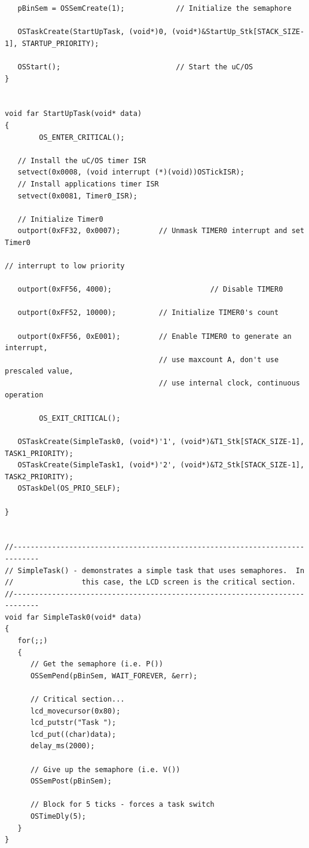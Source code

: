 \begin{verbatim}
   pBinSem = OSSemCreate(1);            // Initialize the semaphore

   OSTaskCreate(StartUpTask, (void*)0, (void*)&StartUp_Stk[STACK_SIZE-1], STARTUP_PRIORITY);

   OSStart();                           // Start the uC/OS
}


void far StartUpTask(void* data)
{
        OS_ENTER_CRITICAL();

   // Install the uC/OS timer ISR
   setvect(0x0008, (void interrupt (*)(void))OSTickISR);
   // Install applications timer ISR
   setvect(0x0081, Timer0_ISR);

   // Initialize Timer0
   outport(0xFF32, 0x0007);         // Unmask TIMER0 interrupt and set Timer0
                                                                                        // interrupt to low priority

   outport(0xFF56, 4000);                       // Disable TIMER0

   outport(0xFF52, 10000);          // Initialize TIMER0's count

   outport(0xFF56, 0xE001);         // Enable TIMER0 to generate an interrupt,
                                    // use maxcount A, don't use prescaled value,
                                    // use internal clock, continuous operation

        OS_EXIT_CRITICAL();

   OSTaskCreate(SimpleTask0, (void*)'1', (void*)&T1_Stk[STACK_SIZE-1], TASK1_PRIORITY);
   OSTaskCreate(SimpleTask1, (void*)'2', (void*)&T2_Stk[STACK_SIZE-1], TASK2_PRIORITY);
   OSTaskDel(OS_PRIO_SELF);

}


//----------------------------------------------------------------------------
// SimpleTask() - demonstrates a simple task that uses semaphores.  In
//                this case, the LCD screen is the critical section.
//----------------------------------------------------------------------------
void far SimpleTask0(void* data)
{
   for(;;)
   {
      // Get the semaphore (i.e. P())
      OSSemPend(pBinSem, WAIT_FOREVER, &err);

      // Critical section...
      lcd_movecursor(0x80);
      lcd_putstr("Task ");
      lcd_put((char)data);
      delay_ms(2000);

      // Give up the semaphore (i.e. V())
      OSSemPost(pBinSem);

      // Block for 5 ticks - forces a task switch
      OSTimeDly(5);
   }
}



\end{verbatim}
